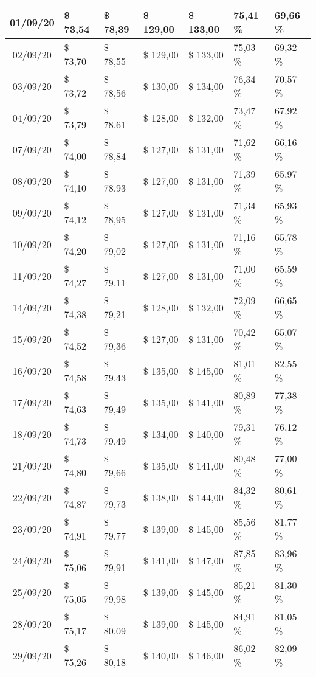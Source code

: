 \begin{center}
\begin{longtable}{|c|p{1.5cm}|p{1.5cm}|p{1.5cm}|p{1.5cm}|p{1.5cm}|p{1.5cm}|}
01/09/20 & \$ 73,54 & \$ 78,39 & \$ 129,00 & \$ 133,00 & 75,41 \% & 69,66 \% \\ \hline
02/09/20 & \$ 73,70 & \$ 78,55 & \$ 129,00 & \$ 133,00 & 75,03 \% & 69,32 \% \\ \hline
03/09/20 & \$ 73,72 & \$ 78,56 & \$ 130,00 & \$ 134,00 & 76,34 \% & 70,57 \% \\ \hline
04/09/20 & \$ 73,79 & \$ 78,61 & \$ 128,00 & \$ 132,00 & 73,47 \% & 67,92 \% \\ \hline
07/09/20 & \$ 74,00 & \$ 78,84 & \$ 127,00 & \$ 131,00 & 71,62 \% & 66,16 \% \\ \hline
08/09/20 & \$ 74,10 & \$ 78,93 & \$ 127,00 & \$ 131,00 & 71,39 \% & 65,97 \% \\ \hline
09/09/20 & \$ 74,12 & \$ 78,95 & \$ 127,00 & \$ 131,00 & 71,34 \% & 65,93 \% \\ \hline
10/09/20 & \$ 74,20 & \$ 79,02 & \$ 127,00 & \$ 131,00 & 71,16 \% & 65,78 \% \\ \hline
11/09/20 & \$ 74,27 & \$ 79,11 & \$ 127,00 & \$ 131,00 & 71,00 \% & 65,59 \% \\ \hline
14/09/20 & \$ 74,38 & \$ 79,21 & \$ 128,00 & \$ 132,00 & 72,09 \% & 66,65 \% \\ \hline
15/09/20 & \$ 74,52 & \$ 79,36 & \$ 127,00 & \$ 131,00 & 70,42 \% & 65,07 \% \\ \hline
16/09/20 & \$ 74,58 & \$ 79,43 & \$ 135,00 & \$ 145,00 & 81,01 \% & 82,55 \% \\ \hline
17/09/20 & \$ 74,63 & \$ 79,49 & \$ 135,00 & \$ 141,00 & 80,89 \% & 77,38 \% \\ \hline
18/09/20 & \$ 74,73 & \$ 79,49 & \$ 134,00 & \$ 140,00 & 79,31 \% & 76,12 \% \\ \hline
21/09/20 & \$ 74,80 & \$ 79,66 & \$ 135,00 & \$ 141,00 & 80,48 \% & 77,00 \% \\ \hline
22/09/20 & \$ 74,87 & \$ 79,73 & \$ 138,00 & \$ 144,00 & 84,32 \% & 80,61 \% \\ \hline
23/09/20 & \$ 74,91 & \$ 79,77 & \$ 139,00 & \$ 145,00 & 85,56 \% & 81,77 \% \\ \hline
24/09/20 & \$ 75,06 & \$ 79,91 & \$ 141,00 & \$ 147,00 & 87,85 \% & 83,96 \% \\ \hline
25/09/20 & \$ 75,05 & \$ 79,98 & \$ 139,00 & \$ 145,00 & 85,21 \% & 81,30 \% \\ \hline
28/09/20 & \$ 75,17 & \$ 80,09 & \$ 139,00 & \$ 145,00 & 84,91 \% & 81,05 \% \\ \hline
29/09/20 & \$ 75,26 & \$ 80,18 & \$ 140,00 & \$ 146,00 & 86,02 \% & 82,09 \% \\ \hline

\end{longtable}
\end{center}

